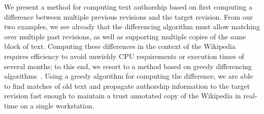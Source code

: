 We present a method for computing text authorship based on
first computing a difference between multiple previous revisions and
the target revision.
From our two examples, we see already that the differencing
algorithm must allow matching over multiple past revisions, as
well as supporting multiple copies of the same block of text.
Computing these differences in the context of the Wikipedia
requires efficiency to avoid unwieldy CPU requirements
or execution times of several months;
to this end, we resort to a method based on greedy differencing
algorithms~\cite{Reichenberger1991,Burns1997}.
Using a greedy algorithm for computing the difference, we are
able to find matches of old text and propagate authorship
information to the target revision fast enough to maintain a trust
annotated copy of the Wikipedia in real-time on a single workstation.


